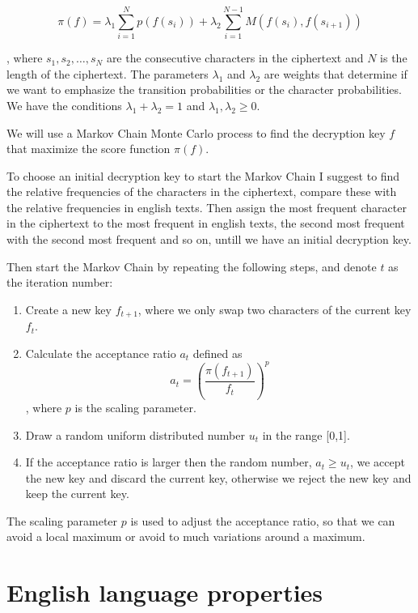 \documentclass[a4paper, 11pt]{article}
\begin{document}
\begin{equation}
  \pi(f) = \lambda_1 \sum_{i=1}^{N} p(f(s_i)) + 
  \lambda_2 \sum_{i=1}^{N-1} M(f(s_i),f(s_{i+1}))
  \label{eq:ScoreFunc}
\end{equation}

, where $s_1,s_2,\dots,s_N$ are the consecutive characters in the ciphertext
and $N$ is the length of the ciphertext. The parameters $\lambda_1$ and 
$\lambda_2$ are weights that determine if we want to emphasize the
transition probabilities or the character probabilities. We have the conditions
$\lambda_1 + \lambda_2 = 1$ and $\lambda_1, \lambda_2 \geq 0$.

We will use a Markov Chain Monte Carlo process to find the decryption key
$f$ that maximize the score function $\pi(f)$.

To choose an initial decryption key to start the Markov Chain I suggest to
find the relative frequencies of the characters in the ciphertext, compare 
these with the relative frequencies in english texts. Then assign the most
frequent character in the ciphertext to the most frequent in english texts, 
the second most frequent with the second most frequent and so on, untill
we have an initial decryption key.

Then start the Markov Chain by repeating the following steps, and denote
$t$ as the iteration number:

\begin{enumerate}
  \item Create a new key $f_{t+1}$, where we only swap two characters of 
  the current key $f_t$.

  \item Calculate the acceptance ratio $a_t$ defined as
  \[
    a_t = \left( \frac{\pi(f_{t+1})}{f_{t}} \right)^p
  \]
  , where $p$ is the scaling parameter.

  \item Draw a random uniform distributed number $u_t$ in the range [0,1].

  \item If the acceptance ratio is larger then the random number, 
  $a_t \geq u_t$, we accept the new key and discard the current key, 
  otherwise we reject the new key and keep the current key.
\end{enumerate}

The scaling parameter $p$ is used to adjust the acceptance ratio, so that
we can avoid a local maximum or avoid to much variations around a maximum.


\section{English language properties}
\end{document}
